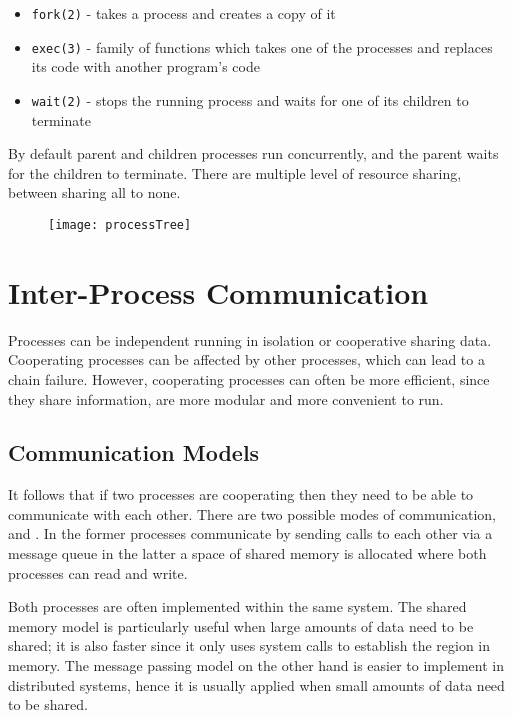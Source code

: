 		\begin{itemize}
			\item[] \texttt{fork(2)} - takes a process and creates a copy of it
			\item[] \texttt{exec(3)} - family of functions which takes one of the processes and replaces its code with another program's code
			\item[] \texttt{wait(2)} - stops the running process and waits for one of its children to terminate
		\end{itemize}

	\par{By default parent and children processes run concurrently, and the parent waits for the children to terminate. There are multiple level of resource sharing, between sharing all to none.}


	\begin{figure}[H]
		\begin{center}
		\texttt{[image: processTree]}
		\end{center}
	\end{figure}


\section{Inter-Process Communication}

	\par{Processes can be independent running in isolation or cooperative sharing data. Cooperating processes can be affected by other processes, which can lead to a chain failure. However, cooperating processes can often be more efficient, since they share information, are more modular and more convenient to run.}

	\subsection{Communication Models}

		\par{It follows that if two processes are cooperating then they need to be able to communicate with each other. There are two possible modes of communication,  and . In the former processes communicate by sending calls to each other via a message queue in the latter a space of shared memory is allocated where  both processes can read and write.}
		\par{Both processes are often implemented within the same system. The shared memory model is particularly useful when large amounts of data need to be shared; it is also faster since it only uses system calls to establish the region in memory. The message passing model on the other hand is easier to implement in distributed systems, hence it is usually applied when small amounts of data need to be shared.}


